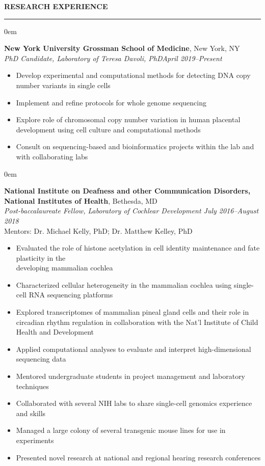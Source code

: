 \documentclass[10pt, letterpaper]{article} %
\newenvironment{CVSection}{
\begin{addmargin}[2em]{0em}
\begin{samepage}}
{\end{samepage}
\end{addmargin}\bigskip}
\newcommand{\CVHeading}[1]{
\MakeUppercase{\bf #1}
\smallskip
\hrule
\medskip
}
\begin{document}
\CVHeading{Research Experience}
\begin{CVSection}
\textbf{New York University Grossman School of Medicine}, New York, NY\\
\textsl{PhD Candidate, Laboratory of Teresa Davoli, PhD\hfill April 2019--Present}
\begin{itemize}
    \item Develop experimental and computational methods for detecting DNA copy number variants in single cells
    \item Implement and refine protocols for whole genome sequencing
    \item Explore role of chromosomal copy number variation in human placental development using cell culture and computational methods
    \item Consult on sequencing-based and bioinformatics projects within the lab and with collaborating labs
\end{itemize}
\end{CVSection}
\begin{CVSection}
\textbf{National Institute on Deafness and other Communication Disorders,\\National Institutes of Health}, Bethesda, MD\\
\textsl{Post-baccalaureate Fellow, Laboratory of Cochlear Development	\hfill July 2016--August 2018\\}
Mentors: Dr. Michael Kelly, PhD; Dr. Matthew Kelley, PhD
\begin{itemize}
\item Evaluated the role of histone acetylation in cell identity maintenance and fate plasticity in the\\ developing mammalian cochlea
\item Characterized cellular heterogeneity in the mammalian cochlea using single-cell RNA sequencing platforms
\item Explored transcriptomes of mammalian pineal gland cells and their role in circadian rhythm regulation in collaboration with the Nat'l Institute of Child Health and Development
\item Applied computational analyses to evaluate and interpret high-dimensional sequencing data
\item Mentored undergraduate students in project management and laboratory techniques
\item Collaborated with several NIH labs to share single-cell genomics experience and skills
\item Managed a large colony of several transgenic mouse lines for use in experiments
\item Presented novel research at national and regional hearing research conferences
\end{itemize}
\end{CVSection}
\end{document}

